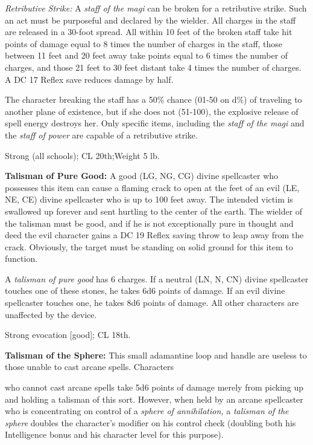\textit{Retributive Strike: }A \textit{staff of the magi }can be broken for a retributive 
strike. Such an act must be purposeful and declared by the wielder. All charges 
in the staff are released in a 30-foot spread. All within 10 feet of the broken 
staff take hit points of damage equal to 8 times the number of charges in the staff, 
those between 11 feet and 20 feet away take points equal to 6 times the number 
of charges, and those 21 feet to 30 feet distant take 4 times the number of charges. 
A DC 17 Reflex save reduces damage by half. 

The character breaking the staff has a 50\% chance (01-50 on d\%) of traveling 
to another plane of existence, but if she does not (51-100), the explosive release 
of spell energy destroys her. Only specific items, including the \textit{staff 
of the magi }and the \textit{staff of power} are capable of a retributive strike.

Strong (all schools); CL 20th;Weight 5 lb.

\vspace{12pt}
\textbf{Talisman of Pure Good:} A good (LG, NG, CG) divine spellcaster who possesses 
this item can cause a flaming crack to open at the feet of an evil (LE, NE, CE) 
divine spellcaster who is up to 100 feet away. The intended victim is swallowed 
up forever and sent hurtling to the center of the earth. The wielder of the talisman 
must be good, and if he is not exceptionally pure in thought and deed the evil 
character gains a DC 19 Reflex saving throw to leap away from the crack. Obviously, 
the target must be standing on solid ground for this item to function. 

A \textit{talisman of pure good }has 6 charges. If a neutral (LN, N, CN) divine 
spellcaster touches one of these stones, he takes 6d6 points of damage. If an evil 
divine spellcaster touches one, he takes 8d6 points of damage. All other characters 
are unaffected by the device.

Strong evocation [good]; CL 18th.

\vspace{12pt}
\textbf{Talisman of the Sphere:} This small adamantine loop and handle are useless 
to those unable to cast arcane spells. Characters

who cannot cast arcane spells take 5d6 points of damage merely from picking up 
and holding a talisman of this sort. However, when held by an arcane spellcaster 
who is concentrating on control of a \textit{sphere of annihilation, }a \textit{talisman 
of the sphere }doubles the character's modifier on his control check (doubling 
both his Intelligence bonus and his character level for this purpose).

